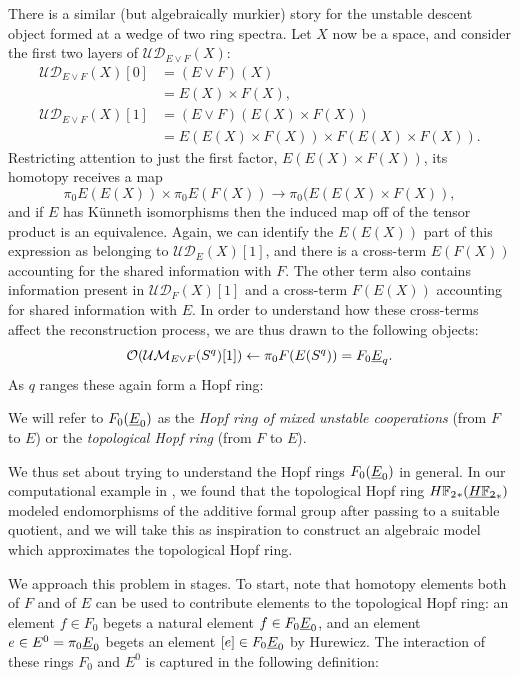 There is a similar (but algebraically murkier) story for the unstable descent object formed at a wedge of two ring spectra.
Let \(X\) now be a space, and consider the first two layers of \(\mathcal{UD}_{E \vee F}(X)\):
\begin{align*}
\mathcal{UD}_{E \vee F}(X)[0] & = (E \vee F)(X) \\
& = E(X) \times F(X), \\
\mathcal{UD}_{E \vee F}(X)[1] & = (E \vee F)(E(X) \times F(X)) \\
& = E(E(X) \times F(X)) \times F(E(X) \times F(X)).
\end{align*}
Restricting attention to just the first factor, \(E(E(X) \times F(X))\), its homotopy receives a map \[\pi_0 E(E(X)) \times \pi_0 E(F(X)) \to \pi_0(E(E(X) \times F(X)),\] and if \(E\) has K\"unneth isomorphisms then the induced map off of the tensor product is an equivalence.
Again, we can identify the \(E(E(X))\) part of this expression as belonging to \(\mathcal{UD}_E(X)[1]\), and there is a cross-term \(E(F(X))\) accounting for the shared information with \(F\).
The other term also contains information present in \(\mathcal{UD}_F(X)[1]\) and a cross-term \(F(E(X))\) accounting for shared information with \(E\).
In order to understand how these cross-terms affect the reconstruction process, we are thus drawn to the following objects: \[\sheaf O(\Ucontext{E \vee F}(S^q)[1]) \leftarrow \pi_0 F(E(S^q)) = F_0 \OS{E}{q}.\]
As \(q\) ranges these again form a Hopf ring:

\begin{definition}
We will refer to \(F_0(\OS{E}{0})\) as the \textit{Hopf ring of mixed unstable cooperations} (from \(F\) to \(E\)) or the \textit{topological Hopf ring} (from \(F\) to \(E\)).
\end{definition}

We thus set about trying to understand the Hopf rings \(F_0(\OS{E}{0})\) in general.
In our computational example in , we found that the topological Hopf ring \(\HFtwo_*(\OS{\HFtwo}{*})\) modeled endomorphisms of the additive formal group after passing to a suitable quotient, and we will take this as inspiration to construct an algebraic model which approximates the topological Hopf ring.

We approach this problem in stages.
To start, note that homotopy elements both of \(F\) and of \(E\) can be used to contribute elements to the topological Hopf ring: an element \(f \in F_0\) begets a natural element \(f \in F_0 \OS{E}{0}\), and an element \(e \in E^0 = \pi_0 \OS{E}{0}\) begets an element \([e] \in F_0 \OS{E}{0}\) by Hurewicz.
The interaction of these rings \(F_0\) and \(E^0\) is captured in the following definition:

